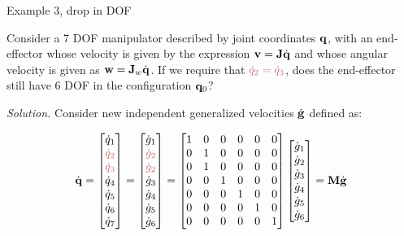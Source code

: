 \documentclass{beamer}
\begin{document}
\begin{frame}{Example 3, drop in DOF}
	\begin{flushleft}
		
		Consider a 7 DOF manipulator described by joint coordinates $\mathbf{q}$, with an end-effector whose velocity is given by the expression $\mathbf{v} = \mathbf{J} \dot{\mathbf{q}}$ and whose angular velocity is given as $\mathbf{w} = \mathbf{J}_w \dot{\mathbf{q}}$. If we require that $\textcolor{myred}{\dot q_2  = \dot q_3}$, does the end-effector still have 6 DOF in the configuration $\mathbf{q}_0$?
		
		\bigskip
		
		\emph{Solution.} Consider new independent generalized velocities $\dot{\mathbf{g}}$ defined as:
		
		\begin{align}
			\dot{\bo{q}}
			=
			\begin{bmatrix}
				\dot q_1 \\ 	\textcolor{myred}{\dot q_2} \\ 	\textcolor{myred}{\dot q_3} \\ 	\dot q_4 \\ 	\dot q_5 \\ 	\dot q_6 \\ 	\dot q_7 
			\end{bmatrix}
			= 
			\begin{bmatrix}
			\dot g_1 \\ 
			\textcolor{myred}{\dot g_2}	 \\ \textcolor{myred}{\dot g_2}	 \\ 	\dot g_3 \\ 		\dot g_4 \\ 	\dot g_5\\ 	\dot g_6
			\end{bmatrix}
			=
			\begin{bmatrix}
				1 & 0& 0& 0& 0& 0 \\
				0 & 1& 0& 0& 0& 0 \\
				0 & 1& 0& 0& 0& 0 \\
				0 & 0& 1& 0& 0& 0 \\
				0 & 0& 0& 1& 0& 0 \\
				0 & 0& 0& 0& 1& 0 \\
				0 & 0& 0& 0& 0& 1 \\
			\end{bmatrix}
			\begin{bmatrix}
				\dot g_1 \\ 	\dot g_2 \\ 	\dot g_3 \\ 		\dot g_4 \\ 	\dot g_5\\ 	\dot g_6
			\end{bmatrix} 
			= 
			\bo{M}\dot{\bo{g}}
		\end{align}
		
		
		
		
	\end{flushleft}
\end{frame}
\end{document}
